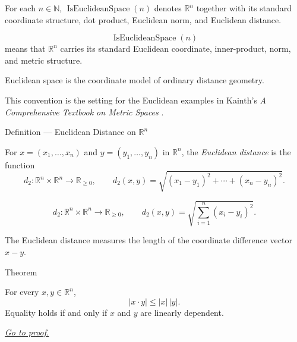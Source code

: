 \begin{remark*}
For each \(n\in\mathbb{N}\), \(\operatorname{IsEuclideanSpace}(n)\) denotes
\(\mathbb{R}^n\) together with its standard coordinate structure, dot product,
Euclidean norm, and Euclidean distance.
\end{remark*}

\begin{remark*}
\[
\operatorname{IsEuclideanSpace}(n)
\]
means that \(\mathbb{R}^n\) carries its standard Euclidean coordinate,
inner-product, norm, and metric structure.
\end{remark*}

\begin{remark*}[Interpretation]
Euclidean space is the coordinate model of ordinary distance geometry.
\end{remark*}

\begin{remark*}
This convention is the setting for the Euclidean examples in Kainth's
\emph{A Comprehensive Textbook on Metric Spaces}
\cite{KainthComprehensiveMetricSpaces2023}.
\end{remark*}

\DefinitionalRoot

\begin{definitionbox}{Definition --- Euclidean Distance on \(\mathbb{R}^n\)}
\begin{definition}
\label{def:euclidean-distance-rn}
For \(x=(x_1,\ldots,x_n)\) and \(y=(y_1,\ldots,y_n)\) in \(\mathbb{R}^n\),
the \emph{Euclidean distance} is the function
\[
  d_2:\mathbb{R}^n\times\mathbb{R}^n\to\mathbb{R}_{\geq 0},
  \qquad
  d_2(x,y)
  =
  \sqrt{(x_1-y_1)^2+\cdots+(x_n-y_n)^2}.
\]
\end{definition}
\end{definitionbox}

\begin{remark*}
\[
d_2:\mathbb{R}^n\times\mathbb{R}^n\to\mathbb{R}_{\geq 0},
\qquad
d_2(x,y)=\sqrt{\sum_{i=1}^n (x_i-y_i)^2}.
\]
\end{remark*}

\begin{remark*}[Interpretation]
The Euclidean distance measures the length of the coordinate difference vector
\(x-y\).
\end{remark*}

\DefinitionalRoot

\begin{theorembox}{Theorem}
\begin{theorem}
\label{thm:cauchy-schwarz-inequality}
For every \(x,y\in\mathbb{R}^n\),
\[
  |x\cdot y|\leq |x|\,|y|.
\]
Equality holds if and only if \(x\) and \(y\) are linearly dependent.

\smallskip
\noindent
\hyperref[prf:cauchy-schwarz-inequality]{\textit{Go to proof.}}
\end{theorem}
\end{theorembox}

